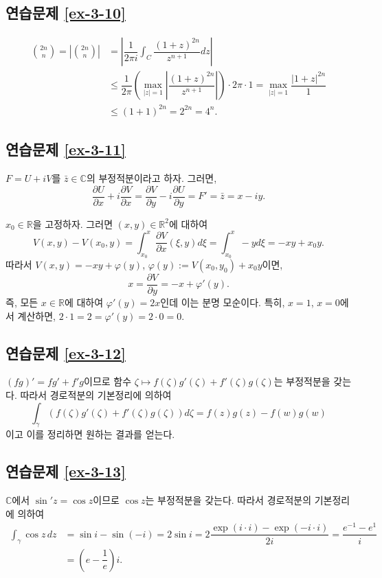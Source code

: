 \subsection*{연습문제 \ref{ex-3-10}}

\begin{align*}
{2n \choose n} = \left|  {2n \choose n} \right|
&= \left| \dfrac1{2\pi i}\int_C \dfrac{(1+z)^{2n}}{z^{n+1}}dz \right| \\
&\le \dfrac1{2\pi} \left( \max_{|z|=1} \left| \dfrac{(1+z)^{2n}}{z^{n+1}}\right| \right)
\cdot 2\pi\cdot 1 = \max_{|z|=1} \dfrac{|1+z|^{2n}}1 \\
&\le (1+1)^{2n} = 2^{2n} = 4^n.
\end{align*}

\subsection*{연습문제 \ref{ex-3-11}}

$F=U+iV$를 $\bar z \in \mathbb C$의 부정적분이라고 하자.
그러면,
\[
\dfrac{\partial U}{\partial x}  + i \dfrac{\partial V}{\partial x}
= \dfrac{\partial V}{\partial y} - i\dfrac{\partial U}{\partial y}
= F' = \bar z = x-iy.
\]

$x_0\in\mathbb R$을 고정하자. 그러면 $(x,y)\in\mathbb R^2$에 대하여
\[
V(x,y ) - V(x_0, y) = \int_{x_0}^x \dfrac{\partial V}{\partial x}(\xi, y )d\xi
= \int_{x_0}^x -y d\xi = -xy +x_0y.
\]
따라서 $V(x,y) = -xy + \varphi(y)$, $\varphi(y):=V(x_0,y_0) + x_0y$이면,
\[
x  = \dfrac{\partial V}{\partial y} = -x + \varphi'(y).
\]
즉, 모든 $x\in\mathbb R$에 대하여 $\varphi'(y) = 2x$인데
이는 분명 모순이다.
특히, $x=1$, $x=0$에서 계산하면,
$2\cdot 1 = 2 = \varphi'(y) = 2\cdot  0 = 0$.

\subsection*{연습문제 \ref{ex-3-12}}

$(fg)' = fg' + f'g$이므로
함수 $\zeta \mapsto f(\zeta)g'(\zeta) + f'(\zeta)g(\zeta)$는 
부정적분을 갖는다.
따라서 경로적분의 기본정리에 의하여
\[
\int_\gamma \left( f(\zeta)g'(\zeta) + f'(\zeta)g(\zeta) \right) d\zeta
= f(z)g(z) - f(w)g(w)
\]
이고 이를 정리하면 원하는 결과를 얻는다.

\subsection*{연습문제 \ref{ex-3-13}}

$\mathbb C$에서 $\sin' z = \cos z$이므로 $\cos z$는 부정적분을 갖는다.
따라서 경로적분의 기본정리에 의하여
\begin{align*}
\int_\gamma \cos z \, dz 
&= \sin i - \sin (-i) = 2\sin i = 2\dfrac{\exp(i\cdot i) - \exp(-i\cdot i)}{2i}
= \dfrac{e^{-1} - e^{1}}i \\
&= \left( e - \dfrac1e \right)i.
\end{align*}


